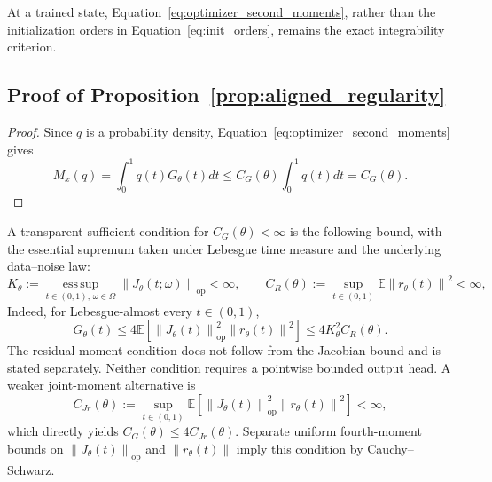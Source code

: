 \documentclass{article}
\theoremstyle{plain}
\theoremstyle{definition}
\theoremstyle{remark}
\newcommand{\Ex}{\mathbb{E}}
\newcommand{\norm}[1]{\left\lVert #1\right\rVert}
\begin{document}
At a trained state, Equation~\eqref{eq:optimizer_second_moments}, rather than the initialization orders in Equation~\eqref{eq:init_orders}, remains the exact integrability criterion.

\subsection{Proof of Proposition~\ref{prop:aligned_regularity}}
\label{app:alignment_proof}

\begin{proof}
Since $q$ is a probability density, Equation~\eqref{eq:optimizer_second_moments} gives
\begin{equation}
M_x(q)=\int_0^1q(t)G_\theta(t)dt
\le C_G(\theta)\int_0^1q(t)dt
=C_G(\theta).
\end{equation}
\end{proof}

A transparent sufficient condition for $C_G(\theta)<\infty$ is the following bound, with the essential supremum taken under Lebesgue time measure and the underlying data--noise law:
\begin{equation}
K_\theta:=\operatorname*{ess\,sup}_{t\in(0,1),\,\omega\in\Omega}\norm{J_\theta(t;\omega)}_{\mathrm{op}}<\infty,
\qquad
C_R(\theta):=\sup_{t\in(0,1)}\Ex\norm{r_\theta(t)}^2<\infty,
\label{eq:jacobian_residual_sufficient}
\end{equation}
Indeed, for Lebesgue-almost every $t\in(0,1)$,
\begin{equation}
G_\theta(t)
\le4\Ex\left[\norm{J_\theta(t)}_{\mathrm{op}}^2\norm{r_\theta(t)}^2\right]
\le4K_\theta^2C_R(\theta).
\end{equation}
The residual-moment condition does not follow from the Jacobian bound and is stated separately. Neither condition requires a pointwise bounded output head. A weaker joint-moment alternative is
\begin{equation}
C_{Jr}(\theta):=\sup_{t\in(0,1)}\Ex\left[\norm{J_\theta(t)}_{\mathrm{op}}^2\norm{r_\theta(t)}^2\right]<\infty,
\end{equation}
which directly yields $C_G(\theta)\le4C_{Jr}(\theta)$. Separate uniform fourth-moment bounds on $\norm{J_\theta(t)}_{\mathrm{op}}$ and $\norm{r_\theta(t)}$ imply this condition by Cauchy--Schwarz.
\end{document}
